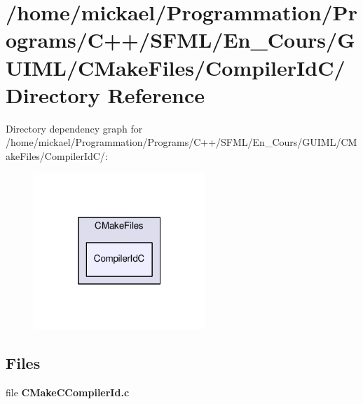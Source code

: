 \section{/home/mickael/\-Programmation/\-Programs/\-C++/\-S\-F\-M\-L/\-En\-\_\-\-Cours/\-G\-U\-I\-M\-L/\-C\-Make\-Files/\-Compiler\-Id\-C/ Directory Reference}
\label{dir_45eba0dd9f41299e3a0967d2c9767342}
Directory dependency graph for /home/mickael/\-Programmation/\-Programs/\-C++/\-S\-F\-M\-L/\-En\-\_\-\-Cours/\-G\-U\-I\-M\-L/\-C\-Make\-Files/\-Compiler\-Id\-C/\-:\nopagebreak
\begin{figure}[H]
\begin{center}
\leavevmode
\includegraphics[width=184pt]{dir_45eba0dd9f41299e3a0967d2c9767342_dep}
\end{center}
\end{figure}
\subsection*{Files}
\begin{DoxyCompactItemize}
\item 
file {\bfseries C\-Make\-C\-Compiler\-Id.\-c}
\end{DoxyCompactItemize}
